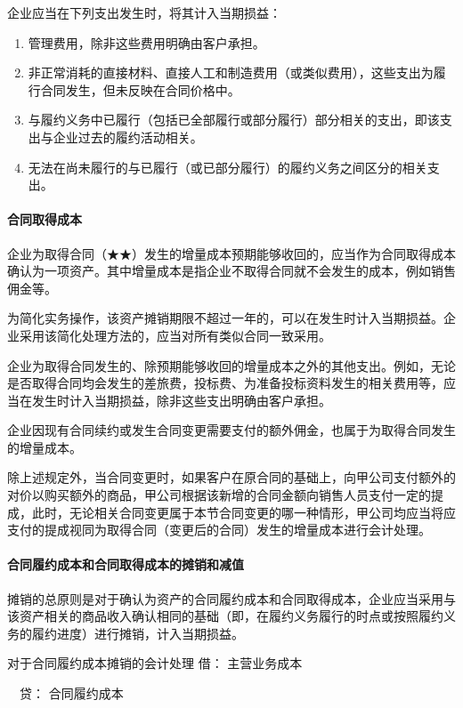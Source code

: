 \documentclass[UTF8,12pt]{ctexart}
\newenvironment{Dr}{\noindent 借：}{\par}
\newenvironment{Cr}{\noindent \ \ 贷：}{\par}
\numberwithin{equation}{section} %
\numberwithin{figure}{section}
\numberwithin{table}{section}
\begin{document}
	企业应当在下列支出发生时，将其计入当期损益：
	\begin{enumerate}
		\item 管理费用，除非这些费用明确由客户承担。
		
		\item 非正常消耗的直接材料、直接人工和制造费用（或类似费用），这些支出为履行合同发生，但未反映在合同价格中。
		
		\item 与履约义务中已履行（包括已全部履行或部分履行）部分相关的支出，即该支出与企业过去的履约活动相关。
		
		\item 无法在尚未履行的与已履行（或已部分履行）的履约义务之间区分的相关支出。
	\end{enumerate}
	
	\paragraph{合同取得成本}
	企业为取得合同（★★）发生的增量成本预期能够收回的，应当作为合同取得成本确认为一项资产。其中增量成本是指企业不取得合同就不会发生的成本，例如销售佣金等。
	
	为简化实务操作，该资产摊销期限不超过一年的，可以在发生时计入当期损益。企业采用该简化处理方法的，应当对所有类似合同一致采用。
	
	企业为取得合同发生的、除预期能够收回的增量成本之外的其他支出。例如，无论是否取得合同均会发生的差旅费，投标费、为准备投标资料发生的相关费用等，应当在发生时计入当期损益，除非这些支出明确由客户承担。
	
	企业因现有合同续约或发生合同变更需要支付的额外佣金，也属于为取得合同发生的增量成本。
	
	除上述规定外，当合同变更时，如果客户在原合同的基础上，向甲公司支付额外的对价以购买额外的商品，甲公司根据该新增的合同金额向销售人员支付一定的提成，此时，无论相关合同变更属于本节合同变更的哪一种情形，甲公司均应当将应支付的提成视同为取得合同（变更后的合同）发生的增量成本进行会计处理。
	
	\paragraph{合同履约成本和合同取得成本的摊销和减值}
	
	摊销的总原则是对于确认为资产的合同履约成本和合同取得成本，企业应当采用与该资产相关的商品收入确认相同的基础（即，在履约义务履行的时点或按照履约义务的履约进度）进行摊销，计入当期损益。
	
	对于合同履约成本摊销的会计处理
	\begin{Dr}
		主营业务成本
	\end{Dr}
	\begin{Cr}
		合同履约成本
	\end{Cr}
	
\end{document}
